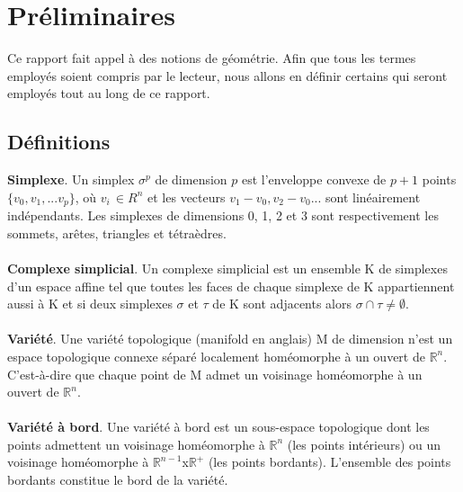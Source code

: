 \newpage
\section{Préliminaires}
\noindent
Ce rapport fait appel à des notions de géométrie. Afin que tous les termes employés soient compris par le lecteur, nous allons en définir certains qui seront employés tout au long de ce rapport.
\subsection{Définitions}
\noindent
\textbf{Simplexe}. Un simplex $\sigma^p$ de dimension $p$ est l'enveloppe convexe de $p+1$ points $\{v_0,v_1,...v_p\}$, où $v_i\, \in R^n$ et les vecteurs $v_1-v_0,v_2-v_0...$ sont linéairement indépendants. Les simplexes de dimensions 0, 1, 2 et 3 sont respectivement les sommets, arêtes, triangles et tétraèdres.\\\\
\textbf{Complexe simplicial}. Un complexe simplicial est un ensemble K de simplexes d'un espace affine tel que toutes les faces de chaque simplexe de K appartiennent aussi à K et si deux simplexes $\sigma$ et $\tau$ de K sont adjacents alors $\sigma \cap \tau \neq \emptyset$.\\\\
\textbf{Variété}. Une variété topologique (manifold en anglais) M de dimension n'est un espace topologique connexe séparé localement homéomorphe à un ouvert de $\mathbb{R}^n$. C'est-à-dire que chaque point de M admet un voisinage homéomorphe à un ouvert de $\mathbb{R}^n$.\\\\
\textbf{Variété à bord}. Une variété à bord est un sous-espace topologique dont les points admettent un voisinage homéomorphe à $\mathbb{R}^n$ (les points intérieurs) ou un voisinage homéomorphe à $\mathbb{R}^{n-1}  $x$ \mathbb{R}^+$ (les points bordants). L'ensemble des points bordants constitue le bord de la variété.\\\\
